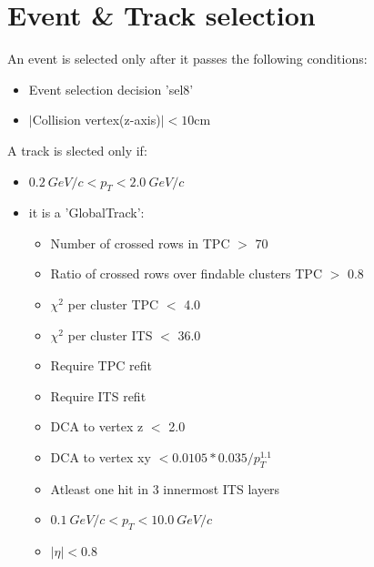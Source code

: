 \documentclass[ALICE,manyauthors]{ALICE_analysis_notes}
\begin{document}
\section{Event \& Track selection}%
An event is selected only after it passes the following conditions:
\begin{itemize}[label=$\bullet$]
	\item Event selection decision 'sel8'
	\item $|$Collision vertex(z-axis)$| < 10$cm
\end{itemize}
A track is slected only if:
\begin{itemize}[label=$\bullet$]
	\item $0.2\ GeV/c<p_T<2.0\ GeV/c$
	\item it is a 'GlobalTrack':
	\begin{itemize}
		\item Number of crossed rows in TPC $>$ 70
		\item Ratio of crossed rows over findable clusters TPC $>$ 0.8
		\item $\chi^2$ per cluster TPC $<$ 4.0
		\item $\chi^2$ per cluster ITS $<$ 36.0
		\item Require TPC refit
		\item Require ITS refit
		\item DCA to vertex z $<$ 2.0
		\item DCA to vertex xy  $<0.0105*0.035/p_T^{1.1}$
		\item Atleast one hit in 3 innermost ITS layers
		\item $0.1\ GeV/c<p_T<10.0\ GeV/c$
		\item $|\eta|<0.8$
	\end{itemize}
\end{itemize}
\end{document}
